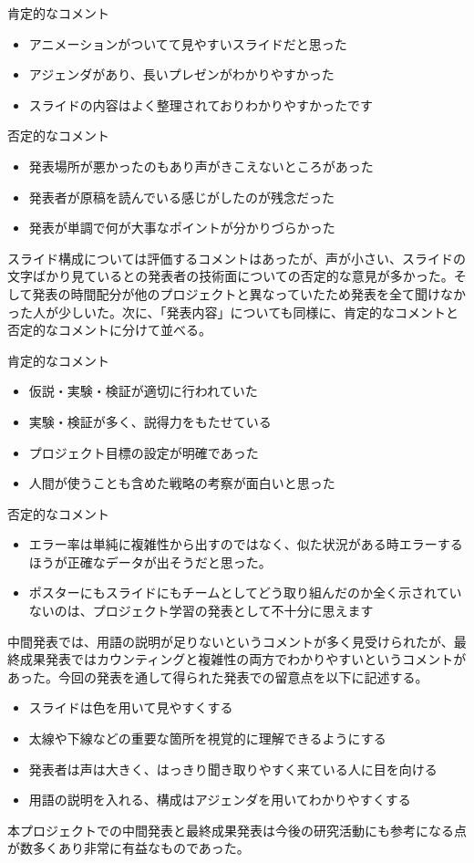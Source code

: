 肯定的なコメント
\begin{itemize}
\item アニメーションがついてて見やすいスライドだと思った
\item アジェンダがあり、長いプレゼンがわかりやすかった
\item スライドの内容はよく整理されておりわかりやすかったです
\end{itemize}

否定的なコメント
\begin{itemize}
\item 発表場所が悪かったのもあり声がきこえないところがあった
\item 発表者が原稿を読んでいる感じがしたのが残念だった
\item 発表が単調で何が大事なポイントが分かりづらかった
\end{itemize}

スライド構成については評価するコメントはあったが、声が小さい、スライドの文字ばかり見ているとの発表者の技術面についての否定的な意見が多かった。そして発表の時間配分が他のプロジェクトと異なっていたため発表を全て聞けなかった人が少しいた。次に、「発表内容」についても同様に、肯定的なコメントと否定的なコメントに分けて並べる。

肯定的なコメント
\begin{itemize}
\item 仮説・実験・検証が適切に行われていた
\item 実験・検証が多く、説得力をもたせている
\item プロジェクト目標の設定が明確であった
\item 人間が使うことも含めた戦略の考察が面白いと思った
\end{itemize}

否定的なコメント
\begin{itemize}
\item エラー率は単純に複雑性から出すのではなく、似た状況がある時エラーするほうが正確なデータが出そうだと思った。
\item ポスターにもスライドにもチームとしてどう取り組んだのか全く示されていないのは、プロジェクト学習の発表として不十分に思えます
\end{itemize}

中間発表では、用語の説明が足りないというコメントが多く見受けられたが、最終成果発表ではカウンティングと複雑性の両方でわかりやすいというコメントがあった。今回の発表を通して得られた発表での留意点を以下に記述する。
\begin{itemize}
\item スライドは色を用いて見やすくする
\item 太線や下線などの重要な箇所を視覚的に理解できるようにする
\item 発表者は声は大きく、はっきり聞き取りやすく来ている人に目を向ける
\item 用語の説明を入れる、構成はアジェンダを用いてわかりやすくする
\end{itemize}

本プロジェクトでの中間発表と最終成果発表は今後の研究活動にも参考になる点が数多くあり非常に有益なものであった。
